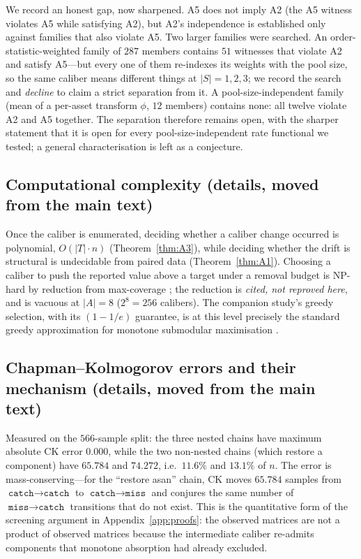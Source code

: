 \documentclass{article}
\newcommand{\catch}{\texttt{catch}}
\newcommand{\miss}{\texttt{miss}}
\begin{document}
We record an honest gap, now sharpened. A5 does not imply A2 (the A5 witness violates A5 while
satisfying A2), but A2's independence is established only against families that also violate A5. Two
larger families were searched. An order-statistic-weighted family of $287$ members contains $51$
witnesses that violate A2 and satisfy A5---but every one of them re-indexes its weights with the pool
size, so the same caliber means different things at $|S|=1,2,3$; we record the search and
\emph{decline} to claim a strict separation from it. A pool-size-independent family (mean of a
per-asset transform $\phi$, $12$ members) contains none: all twelve violate A2 and A5 together. The
separation therefore remains open, with the sharper statement that it is open for every
pool-size-independent rate functional we tested; a general characterisation is left as a conjecture.

\subsection{Computational complexity (details, moved from the main text)}
\label{app:complexitydetail}

Once the caliber is enumerated, deciding whether a caliber change occurred is polynomial, $O(|T|\cdot n)$
(Theorem~\ref{thm:A3}), while deciding whether the drift is structural is undecidable from paired data
(Theorem~\ref{thm:A1}). Choosing a caliber to push the reported value above a target under a removal budget
is NP-hard by reduction from max-coverage \citep{feige1998threshold}; the reduction is \emph{cited, not
reproved here}, and is vacuous at $|A|=8$ ($2^{8}=256$ calibers). The companion study's greedy selection,
with its $(1-1/e)$ guarantee, is at this level precisely the standard greedy approximation for monotone
submodular maximisation \citep{nemhauser1978submodular,krause2014submodular}.

\subsection{Chapman--Kolmogorov errors and their mechanism (details, moved from the main text)}
\label{app:ckdetail}

Measured on the $566$-sample split: the three nested chains have maximum absolute CK error $0.000$, while
the two non-nested chains (which restore a component) have $65.784$ and $74.272$, i.e.\ $11.6\%$ and
$13.1\%$ of $n$. The error is mass-conserving---for the ``restore asan'' chain, CK moves $65.784$ samples
from $\catch{\to}\catch$ to $\catch{\to}\miss$ and conjures the same number of $\miss{\to}\catch$
transitions that do not exist. This is the quantitative form of the screening argument in
Appendix~\ref{app:proofs}: the observed matrices are not a product of observed matrices because the
intermediate caliber re-admits components that monotone absorption had already excluded.
\end{document}
